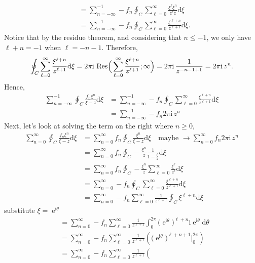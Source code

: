 \documentclass[10pt]{amsart}
\newcommand{\D}{\mathrm{d}}
\newcommand{\I}{\mathrm{i}}
\DeclareMathOperator{\E}{e}
\theoremstyle{nonumberplain}
\begin{document}
\begin{enumerate}[label={\bf {\arabic*}:}]
\begin{enumerate}
\begin{align*}
&= \sum_{n = -\infty}^{-1} - f_n \oint_{C} \sum_{\ell = 0}^\infty \frac {\xi^\ell\xi^n}{z^\ell z} \D \xi \\
&= \sum_{n = -\infty}^{-1} - f_n \oint_{C} \sum_{\ell = 0}^\infty \frac {\xi^{\ell + n}}{z^{\ell + 1}} \D \xi.
\end{align*}
Notice that by the residue theorem, and considering that $n \leq -1$, we only have $\ell + n = -1$ when $\ell = -n -1$.
Therefore,
$$
\oint_{C} \sum_{\ell = 0}^\infty \frac {\xi^{\ell + n}}{z^{\ell + 1}} \D \xi
	= 2\pi \I \,\, {\rm Res}\Big( \sum_{\ell = 0}^\infty \frac {\xi^{\ell + n}}{z^{\ell + 1}}; \infty \Big)
	= 2\pi \I \, \frac 1 {z^{-n-1 + 1}}
	= 2\pi \I \, z^n.
$$
Hence,
\begin{align*}
\sum_{n = -\infty}^{-1} \oint_{C} \frac{ f_n \xi^n }{\xi - z} \D \xi
	&= \sum_{n = -\infty}^{-1} - f_n \oint_{C} \sum_{\ell = 0}^\infty \frac {\xi^{\ell + n}}{z^{\ell + 1}} \D \xi \\
	&= \sum_{n = -\infty}^{-1} - f_n 2\pi \I \, z^n
\end{align*}
Next, let's look at solving the term on the right where $n \geq 0$,
\begin{align*}
\sum_{n = 0}^\infty \oint_{C} \frac{ f_n \xi^n }{\xi - z} \D \xi
	&= \sum_{n = 0}^\infty f_n \oint_{C} \frac{ \xi^n }{\xi - z} \D \xi
		\quad \text{maybe } \rightarrow \sum_{n = 0}^\infty f_n 2 \pi \I \, z^n \\
	&= \sum_{n = 0}^\infty f_n \oint_{C} - \frac {\xi^n} z \frac 1 {1 - \frac \xi z} \D \xi \\
	&= \sum_{n = 0}^\infty f_n \oint_{C} - \frac {\xi^n} z \sum_{\ell = 0}^\infty \frac {\xi^\ell}{z^\ell} \D \xi \\
	&= \sum_{n = 0}^\infty - f_n \oint_{C} \sum_{\ell = 0}^\infty \frac {\xi^{\ell + n}}{z^{\ell + 1}} \D \xi \\
	&= \sum_{n = 0}^\infty - f_n \sum_{\ell = 0}^\infty \frac 1 {z^{\ell + 1}} \oint_{C} \xi^{\ell + n} \D \xi
\end{align*}
substitute $\xi = \E^{\I \theta}$
\begin{align*}
	&= \sum_{n = 0}^\infty - f_n \sum_{\ell = 0}^\infty \frac 1 {z^{\ell + 1}} \int_0^{2 \pi} \big(\E^{\I \theta}\big)^{\ell + n} \I \E^{\I \theta} \D \theta \\
	&= \sum_{n = 0}^\infty - f_n \sum_{\ell = 0}^\infty \frac 1 {z^{\ell + 1}} \left(
		\big(\E^{\I \theta}\big)^{\ell + n + 1} \Big|_0^{2 \pi}
	\right) \\
	&= \sum_{n = 0}^\infty - f_n \sum_{\ell = 0}^\infty \frac 1 {z^{\ell + 1}} \left(

\end{align*}
\end{enumerate}
\end{enumerate}
\end{document}
